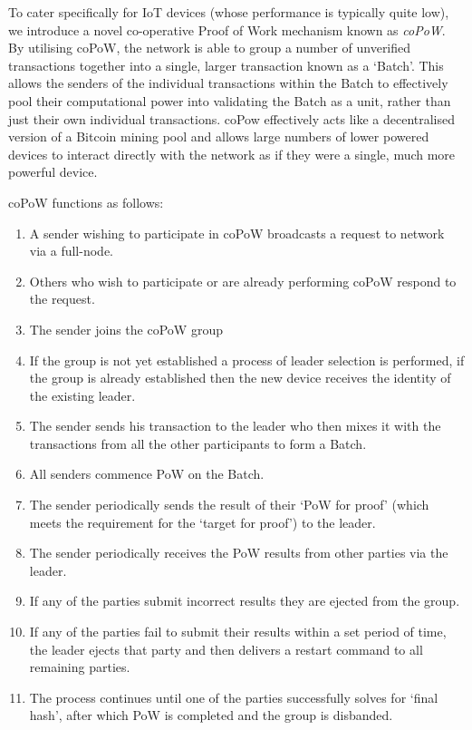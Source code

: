 \documentclass[a4paper,10pt,twocolumn]{article}
\begin{document}
To cater specifically for IoT devices (whose performance is typically quite low), we introduce a novel co-operative Proof of Work 
mechanism known as \emph{coPoW}. By utilising coPoW, the network is able to group a number of unverified transactions together into a 
single, larger transaction known as a `Batch'. This allows the senders of the individual transactions within the Batch to effectively 
pool their computational power into validating the Batch as a unit, rather than just their own individual transactions.
coPow effectively acts like a decentralised version of a Bitcoin mining pool and allows large numbers of lower powered devices to interact directly with the network as if they were a single, much more powerful device.

coPoW functions as follows:

\vspace{-0.5\baselineskip}
\begin{enumerate}
	\setlength\itemsep{0em}
	\item A sender wishing to participate in coPoW broadcasts a request to network via a full-node.
	\item Others who wish to participate or are already performing coPoW respond to the request.
	\item The sender joins the coPoW group
	\item If the group is not yet established a process of leader selection is performed, if the group is already established then 
	the new device receives the identity of the existing leader.
	\item The sender sends his transaction to the leader who then mixes it with the transactions from all the other participants to 
	form a Batch.
	\item All senders commence PoW on the Batch.
	\item The sender periodically sends the result of their `PoW for proof' (which meets the requirement for the `target for proof') to the leader.
	\item The sender periodically receives the PoW results from other parties via the leader. 
	\item If any of the parties submit incorrect results they are ejected from the group.
	\item If any of the parties fail to submit their results within a set period of time, the leader ejects that party and then 
	delivers a restart command to all remaining parties.
	\item The process continues until one of the parties successfully solves for `final hash', after which PoW is completed and 
	the group is disbanded.
\end{enumerate}
\end{document}
